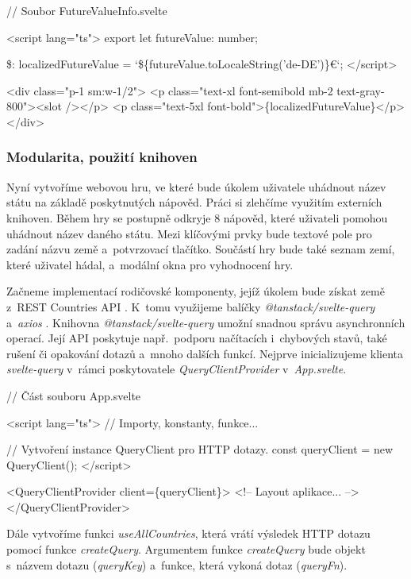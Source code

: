 \begin{prog}
// Soubor FutureValueInfo.svelte
  
<script lang="ts">
  export let futureValue: number;

  \$: localizedFutureValue = `\$\{futureValue.toLocaleString('de-DE')\}€`;
</script>

<div class="p-1 sm:w-1/2">
  <p class="text-xl font-semibold mb-2 text-gray-800"><slot /></p>
  <p class="text-5xl font-bold">\{localizedFutureValue\}</p>
</div>
\end{prog}

\subsubsection*{Modularita, použití knihoven}

Nyní vytvoříme webovou hru, ve které bude úkolem uživatele uhádnout název státu na základě poskytnutých nápověd. Práci si zlehčíme využitím externích knihoven. 
Během hry se postupně odkryje 8 nápověd, které uživateli pomohou uhádnout název daného státu. Mezi klíčovými prvky bude textové pole pro zadání názvu země a~potvrzovací tlačítko. 
Součástí hry bude také seznam zemí, které uživatel hádal, a~modální okna pro vyhodnocení hry.

Začneme implementací rodičovské komponenty, jejíž úkolem bude získat země z~REST Countries API \cite{restcountriesapi}. 
K~tomu využijeme balíčky \emph{@tanstack/svelte-query} \cite{tanstackquerylib} a~\emph{axios} \cite{axioslib}. 
Knihovna \emph{@tanstack/svelte-query} umožní snadnou správu asynchronních operací. Její API poskytuje např.~podporu načítacích i~chybových stavů, také rušení či opakování dotazů a~mnoho dalších funkcí. 
Nejprve inicializujeme klienta \emph{svelte-query} v~rámci poskytovatele \emph{QueryClientProvider} v~\emph{App.svelte}.

\begin{prog}
// Část souboru App.svelte

<script lang="ts">
  // Importy, konstanty, funkce...  

  // Vytvoření instance QueryClient pro HTTP dotazy.
  const queryClient = new QueryClient();
</script>

<QueryClientProvider client=\{queryClient\}>
  <!-- Layout aplikace... -->
</QueryClientProvider>
\end{prog}

Dále vytvoříme funkci \emph{useAllCountries}, která vrátí výsledek HTTP dotazu pomocí funkce \emph{createQuery}. 
Argumentem funkce \emph{createQuery} bude objekt s~názvem dotazu (\emph{queryKey}) a~funkce, která vykoná dotaz (\emph{queryFn}).


